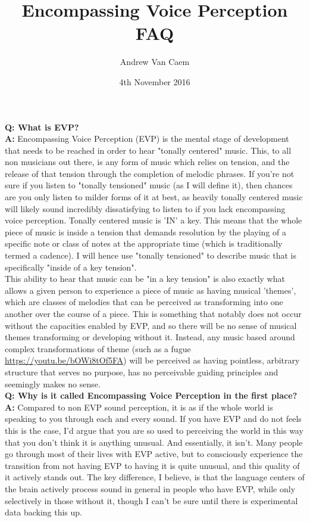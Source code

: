 \documentclass[]{article}
\title{Encompassing Voice Perception FAQ}
\author{Andrew Van Caem}
\date{4th November 2016}
\begin{document}
\maketitle

\textbf{Q: What is EVP?}\\

\textbf{A:} Encompassing Voice Perception (EVP) is the mental stage of development that needs to be reached in order to hear "tonally centered" music. This, to all non musicians out there, is any form of music which relies on tension, and the release of that tension through the completion of melodic phrases. If you're not sure if you listen to "tonally tensioned" music (as I will define it), then chances are you only listen to milder forms of it at best, as heavily tonally centered music will likely sound incredibly dissatisfying to listen to if you lack encompassing voice perception. Tonally centered music is 'IN' a key. This means that the whole piece of music is inside a tension that demands resolution by the playing of a specific note or class of notes at the appropriate time (which is traditionally termed a cadence). I will hence use "tonally tensioned" to describe music that is specifically "inside of a key tension".\\

This ability to hear that music can be "in a key tension" is also exactly what allows a given person to experience a piece of music as having musical 'themes', which are classes of melodies that can be perceived as transforming into one another over the course of a piece. This is something that notably does not occur without the capacities enabled by EVP, and so there will be no sense of musical themes transforming or developing without it. Instead, any music based around complex transformations of theme (such as a fugue \url{https://youtu.be/bOWi8tOf5FA}) will be perceived as having pointless, arbitrary structure that serves no purpose, has no perceivable guiding principles and seemingly makes no sense.\\

\textbf{Q: Why is it called Encompassing Voice Perception in the first place?}\\

\textbf{A:} Compared to non EVP sound perception, it is as if the whole world is speaking to you through each and every sound. If you have EVP and do not feels this is the case, I'd argue that you are so used to perceiving the world in this way that you don't think it is anything unusual. And essentially, it isn't. Many people go through most of their lives with EVP active, but to consciously experience the transition from not having EVP to having it is quite unusual, and this quality of it actively stands out. The key difference, I believe, is that the language centers of the brain actively process sound in general in people who have EVP, while only selectively in those without it, though I can't be sure until there is experimental data backing this up.\\
\end{document}
